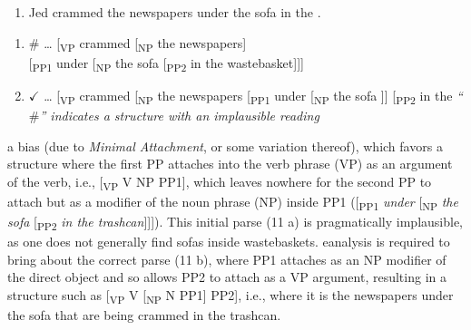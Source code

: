 \documentclass[12pt,oneside]{book}
\providecommand{\tightlist}{%
  \setlength{\itemsep}{0pt}\setlength{\parskip}{0pt}}
\begin{document}
\begin{enumerate}
\def\labelenumi{(\arabic{enumi})}
\setcounter{enumi}{10}
\tightlist
\item
  Jed crammed the newspapers under the sofa in the .
\end{enumerate}

\begin{enumerate}
\def\labelenumi{\alph{enumi})}
\tightlist
\item
  \(\#\) \ldots{} {[}\textsubscript{VP} crammed {[}\textsubscript{NP} the newspapers{]}\\
  {[}\textsubscript{PP1} under {[}\textsubscript{NP} the sofa {[}\textsubscript{PP2} in the wastebasket{]}{]}{]}\\
\item
  \(\checkmark\) \ldots{} {[}\textsubscript{VP} crammed {[}\textsubscript{NP} the newspapers {[}\textsubscript{PP1} under {[}\textsubscript{NP} the sofa {]}{]}
  {[}\textsubscript{PP2} in the \replaced{wastebasket}{trashcan}{]}{]}
  \emph{``\(\#\)'' indicates a structure with an implausible reading}
\end{enumerate}

 a  bias (due to \emph{Minimal Attachment}, or some variation thereof), which favors a structure where the first PP attaches into the verb phrase (VP) as an argument of the verb, i.e., {[}\textsubscript{VP} V NP PP1{]}, which leaves nowhere for the second PP to attach but as a modifier of the noun phrase (NP) inside PP1 ({[}\textsubscript{PP1} \emph{under} {[}\textsubscript{NP} \emph{the sofa} {[}\textsubscript{PP2} \emph{in the trashcan}{]}{]}{]}). This initial parse (11 a) is pragmatically implausible, as one does not generally find sofas inside wastebaskets.  eanalysis is required to bring about the correct parse (11 b), where PP1 attaches as an NP modifier of the direct object and so allows PP2 to attach as a VP argument, resulting in a structure such as {[}\textsubscript{VP} V {[}\textsubscript{NP} N PP1{]} PP2{]}, i.e., where it is the newspapers under the sofa that are being crammed in the trashcan.

\end{document}
